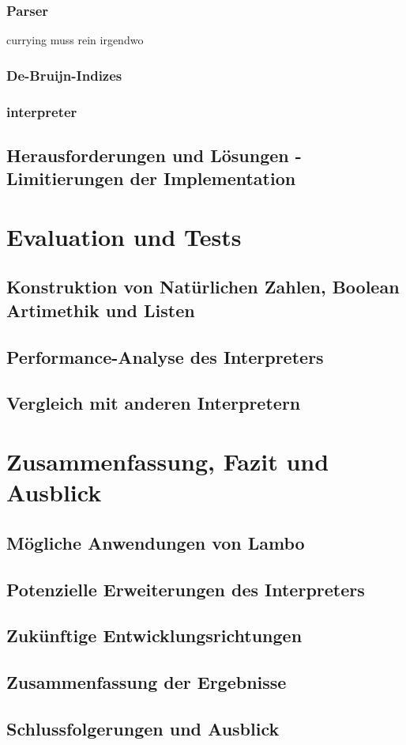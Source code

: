 \documentclass[ngerman]{article}
\begin{document}
\subsubsection{Parser}

currying muss rein irgendwo

\subsubsection{De-Bruijn-Indizes}

\subsubsection{interpreter}

\subsection{Herausforderungen und Lösungen - Limitierungen der Implementation}


\section{Evaluation und Tests}

\subsection{Konstruktion von Natürlichen Zahlen, Boolean Artimethik und Listen}

\subsection{Performance-Analyse des Interpreters}

\subsection{Vergleich mit anderen Interpretern}


\section{Zusammenfassung, Fazit und Ausblick}

\subsection{Mögliche Anwendungen von Lambo}

\subsection{Potenzielle Erweiterungen des Interpreters}

\subsection{Zukünftige Entwicklungsrichtungen}

\subsection{Zusammenfassung der Ergebnisse}

\subsection{Schlussfolgerungen und Ausblick}

\end{document}
